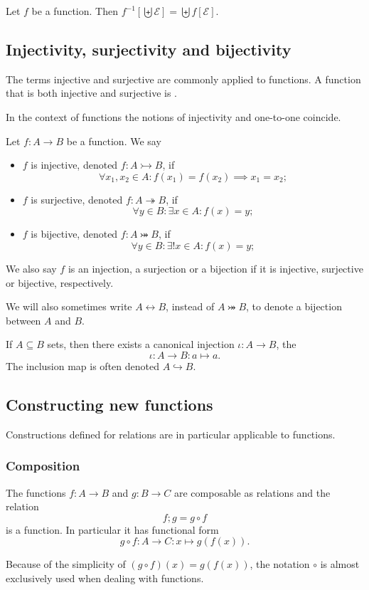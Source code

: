 \begin{lemma}
Let $f$ be a function. Then $f^{-1}[\biguplus \mathcal{E}] = \biguplus f[\mathcal{E}]$.
\end{lemma}

\subsection{Injectivity, surjectivity and bijectivity}
\begin{definition}
The terms injective and surjective are commonly applied to functions. A function that is both injective and surjective is .
\end{definition}
In the context of functions the notions of injectivity and one-to-one coincide.
\begin{lemma}
Let $f:A\to B$ be a function. We say
\begin{itemize}
\item $f$ is injective, denoted $f: A\rightarrowtail B$, if
\[ \forall x_1,x_2\in A: f(x_1) = f(x_2) \implies x_1 = x_2; \]
\item $f$ is surjective, denoted $f: A\twoheadrightarrow B$, if
\[ \forall y\in B: \exists x\in A: f(x) = y; \]
\item $f$ is bijective, denoted $f: A\twoheadrightarrowtail B$, if
\[ \forall y\in B: \exists! x\in A: f(x) = y; \]
\end{itemize}
We also say $f$ is an injection, a surjection or a bijection if it is injective, surjective or bijective, respectively.

We will also sometimes write $A \leftrightarrow B$, instead of $A\twoheadrightarrowtail B$, to denote a bijection between $A$ and $B$.
\end{lemma}

\begin{lemma}
If $A\subseteq B$ sets, then there exists a canonical injection $\iota: A\to B$, the 
\[ \iota: A\to B: a\mapsto a. \]
The inclusion map is often denoted $A\hookrightarrow B$.
\end{lemma}




\subsection{Constructing new functions}
Constructions defined for relations are in particular applicable to functions.

\subsubsection{Composition}
\begin{lemma}
The functions $f:A\to B$ and $g:B\to C$ are composable as relations and the relation
\[ f;g = g\circ f \]
is a function. In particular it has functional form
\[ g\circ f: A\to C: x\mapsto g(f(x)). \]
\end{lemma}
Because of the simplicity of $(g\circ f)(x) = g(f(x))$, the notation $\circ$ is almost exclusively used when dealing with functions.

